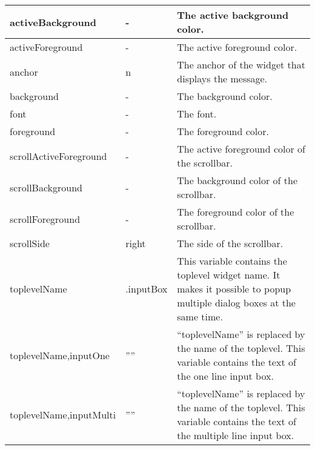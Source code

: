 {\newpage
\clearpage
\samepage \begin{supertabular}{|l|l|p{4.7cm}|}
activeBackground        & -         & The active background
                                      color.\\  \hline
activeForeground        & -         & The active foreground
                                      color.\\  \hline
anchor                  & n         & The anchor of the
                                      widget that displays
                                      the message.\\  \hline
background              & -         & The background
                                      color.\\  \hline 
font                    & -         & The font.\\  \hline
foreground              & -         & The foreground
                                      color.\\  \hline
scrollActiveForeground  & -         & The active foreground
                                      color of the scrollbar.\\  \hline 
scrollBackground        & -         & The background color
                                      of the scrollbar.\\  \hline
scrollForeground        & -         & The foreground color
                                      of the scrollbar.\\  \hline
scrollSide              & right     & The side of the
                                      scrollbar.\\  \hline
toplevelName            & .inputBox & This variable contains
                                      the top\-level widget
                                      name. It makes it
                                      possible to popup
                                      multiple dialog boxes
                                      at the same time.\\  \hline
toplevelName,inputOne   & ''''      & ``toplevelName'' is
                                      replaced by the name
                                      of the toplevel. This
                                      variable contains the
                                      text of the one line
                                      input box.\\  \hline
toplevelName,inputMulti & ''''      & ``toplevelName'' is
                                      replaced by the name
                                      of the toplevel. This
                                      variable contains the
                                      text of the multiple
                                      line input box.\\  \hline
\end{supertabular}
}

